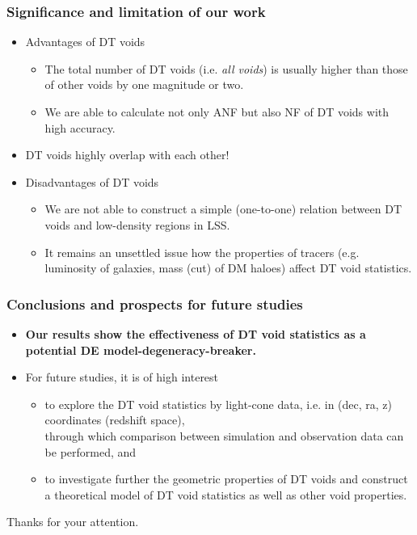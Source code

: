 \documentclass{beamer}
\newtheorem{Acknowledgements}{Acknowledgements}
\newtheorem{Narrow down the analysis}{Narrow down the analysis}
\begin{document}
\begin{frame}
	\frametitle{Significance and limitation of our work}
	\begin{itemize}
	\pause \item Advantages of DT voids
		\begin{itemize}
		\pause \item The total number of DT voids (i.e. \textit{all voids}) is usually higher than those of other voids by one magnitude or two.
		\pause \item We are able to calculate not only ANF but also NF of DT voids with high accuracy.
		\end{itemize}
	\pause \item[\checkmark] DT voids highly overlap with each other!
	\pause \item Disadvantages of DT voids
		\begin{itemize}
		\pause \item We are not able to construct a simple (one-to-one) relation between DT voids and low-density regions in LSS. 
		 \pause \item It remains an unsettled issue how the properties of tracers (e.g. luminosity of galaxies, mass (cut) of DM haloes) affect DT void statistics.
		\end{itemize}
	\end{itemize}
\end{frame}

\begin{frame}
	\frametitle{Conclusions and prospects for future studies}
	\begin{itemize}
	\pause \item \textbf{Our results show the effectiveness of DT void statistics as a potential DE model-degeneracy-breaker.}
	\pause \item For future studies, it is of high interest 
	\begin{itemize}
	\item to explore the DT void statistics by light-cone data, i.e. in (dec, ra, z) coordinates (redshift space), \\
	\pause through which comparison between simulation and observation data can be performed, \pause and
	\item to investigate further the geometric properties of DT voids and construct a theoretical model of DT void statistics as well as other void properties.
	\end{itemize}
	\end{itemize}
	\pause
	\centering
	\large{Thanks for your attention.}
	\pause
\end{frame}
\end{document}
